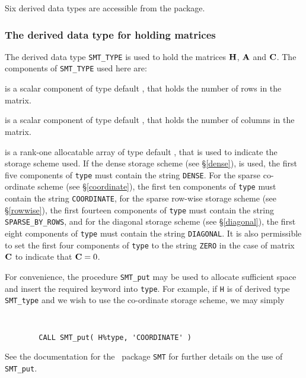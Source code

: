 \documentclass{galahad}
\begin{document}

\galtypes
Six derived data types are accessible from the package.


\subsubsection{The derived data type for holding matrices}\label{typesmt}
The derived data type {\tt SMT\_TYPE} is used to hold the matrices ${\mathbf{H}}$,
${\mathbf{A}}$ and ${\mathbf{C}}$. The components of {\tt SMT\_TYPE} used here are:

\begin{description}

 is a scalar component of type default \integer, 
that holds the number of rows in the matrix. 
 
 is a scalar component of type default \integer, 
that holds the number of columns in the matrix. 
 
 is a rank-one allocatable array of type default \character, that
is used to indicate the storage scheme used. If the dense storage scheme 
(see \S\ref{dense}), is used, 
the first five components of {\tt type} must contain the
string {\tt DENSE}.
For the sparse co-ordinate scheme (see \S\ref{coordinate}), 
the first ten components of {\tt type} must contain the
string {\tt COORDINATE},  
for the sparse row-wise storage scheme (see \S\ref{rowwise}),
the first fourteen components of {\tt type} must contain the
string {\tt SPARSE\_BY\_ROWS},
and for the diagonal storage scheme (see \S\ref{diagonal}),
the first eight components of {\tt type} must contain the
string {\tt DIAGONAL}. It is also permissible to set
the first four components of {\tt type} to the string
{\tt ZERO} in the case of matrix ${\mathbf{C}}$ to indicate that ${\mathbf{C}} = 0$.

For convenience, the procedure {\tt SMT\_put} 
may be used to allocate sufficient space and insert the required keyword
into {\tt type}.
For example, if {\tt H} is of derived type {\tt SMT\_type}
and we wish to use the co-ordinate storage scheme, we may simply
{\tt 
\begin{verbatim}
        CALL SMT_put( H%type, 'COORDINATE' )
\end{verbatim}
}
\noindent
See the documentation for the \galahad\ package {\tt SMT} 
for further details on the use of {\tt SMT\_put}.


\end{description}
\end{document}
